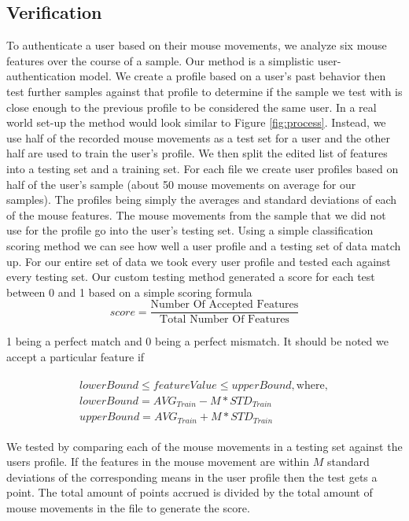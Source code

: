 \documentclass[conference]{IEEEtran}
\begin{document}
\subsection{Verification}
	To authenticate a user based on their mouse movements, we analyze six mouse features over the course of a sample. Our method is a simplistic user-authentication model. We create a profile based on a user's past behavior then test further samples against that profile to determine if the sample we test with is close enough to the previous profile to be considered the same user. In a real world set-up the method would look similar to Figure \ref{fig:process}. Instead, we use half of the recorded mouse movements as a test set for a user and the other half are used to train the user's profile.
We then split the edited list of features into a testing set and a training set. For each file we create user profiles based on half of the user's sample (about 50 mouse movements on average for our samples). The profiles being simply the averages and standard deviations of each of the mouse features. The mouse movements from the sample that we did not use for the profile go into the user's testing set.
Using a simple classification scoring method we can see how well a user profile and a testing set of data match up. For our entire set of data we took every user profile and tested each against every testing set. Our custom testing method generated a score for each test between 0 and 1 based on a simple scoring formula 
\begin{equation} 
score = \frac{\text{Number Of Accepted Features}}{\text{Total Number Of Features}}
\end{equation}

1 being a perfect match and 0 being a perfect mismatch. It should be noted we accept a particular feature if

\begin{equation}
\begin{split}
\begin{gathered}
   lowerBound \leq featureValue \leq upperBound, \text{where},\\
   lowerBound = AVG_{Train} - M * STD_{Train}\\
   upperBound = AVG_{Train} + M * STD_{Train}
\end{gathered}
\end{split}
\end{equation}


We tested by comparing each of the mouse movements in a testing set against the users profile. If the features in the mouse movement are within $M$ standard deviations of the corresponding means in the user profile then the test gets a point. The total amount of points accrued is divided by the total amount of mouse movements in the file to generate the score.
	
\end{document}
